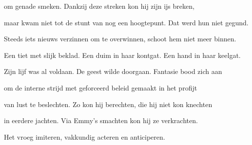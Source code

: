 om genade smeken.
Dankzij deze streken
kon hij zijn ijs breken,

maar kwam niet tot de stunt
van nog een hoogtepunt.
Dat werd hun niet gegund.

Steeds iets nieuws verzinnen
om te overwinnen,
schoot hem niet meer binnen.

Een tiet met slijk beklad.
Een duim in haar kontgat.
Een hand in haar keelgat.

Zijn lijf was al voldaan.
De geest wilde doorgaan.
Fantasie bood zich aan

om de interne strijd
met geforceerd beleid
gemaakt in het profijt

van lust te beslechten.
Zo kon hij berechten,
die hij niet kon knechten

in eerdere jachten.
Via Emmy’s smachten
kon hij ze verkrachten.

Het vroeg imiteren,
vakkundig acteren
en anticiperen.
